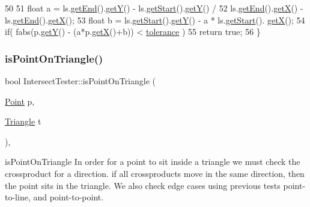 \begin{DoxyCode}
50 
51         \textcolor{keywordtype}{float} a = ls.\hyperlink{class_line_segment_a7b05f883c369b950e61009edfafbbd0e}{getEnd}().\hyperlink{class_point_a2371ffadbe245d12a8f556d0a976521b}{getY}() - ls.\hyperlink{class_line_segment_afcff6bd5f6a3073a44f7b21db0be876f}{getStart}().\hyperlink{class_point_a2371ffadbe245d12a8f556d0a976521b}{getY}() /
52                   ls.\hyperlink{class_line_segment_a7b05f883c369b950e61009edfafbbd0e}{getEnd}().\hyperlink{class_point_a29c44ec7c7279e02629645a06cdaf7d5}{getX}() - ls.\hyperlink{class_line_segment_a7b05f883c369b950e61009edfafbbd0e}{getEnd}().\hyperlink{class_point_a29c44ec7c7279e02629645a06cdaf7d5}{getX}();
53         \textcolor{keywordtype}{float} b = ls.\hyperlink{class_line_segment_afcff6bd5f6a3073a44f7b21db0be876f}{getStart}().\hyperlink{class_point_a2371ffadbe245d12a8f556d0a976521b}{getY}() - a * ls.\hyperlink{class_line_segment_afcff6bd5f6a3073a44f7b21db0be876f}{getStart}().
      \hyperlink{class_point_a29c44ec7c7279e02629645a06cdaf7d5}{getX}();
54         \textcolor{keywordflow}{if}( fabs(p.\hyperlink{class_point_a2371ffadbe245d12a8f556d0a976521b}{getY}() - (a*p.\hyperlink{class_point_a29c44ec7c7279e02629645a06cdaf7d5}{getX}()+b)) < \hyperlink{class_intersect_tester_a50c5d2e177394644ceee23c700a541fd}{tolerance} )
55             \textcolor{keywordflow}{return} \textcolor{keyword}{true};
56 \}
\end{DoxyCode}
\mbox{\label{class_intersect_tester_a04fb92f5e4c68c3f3a91321b94c6011f}} 
\subsubsection{\texorpdfstring{is\+Point\+On\+Triangle()}{isPointOnTriangle()}}
{\footnotesize\ttfamily bool Intersect\+Tester\+::is\+Point\+On\+Triangle (\begin{DoxyParamCaption}\item[{\hyperlink{class_point}{Point}}]{p,  }\item[{\hyperlink{class_triangle}{Triangle}}]{t }\end{DoxyParamCaption})\hspace{0.3cm}{\ttfamily [static]}, {\ttfamily [private]}}



is\+Point\+On\+Triangle In order for a point to sit inside a triangle we must check the crossproduct for a direction. if all crossproducts move in the same direction, then the point sits in the triangle. We also check edge cases using previous tests point-\/to-\/line, and point-\/to-\/point. 


